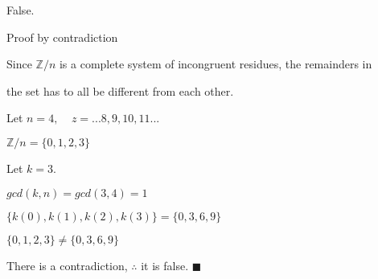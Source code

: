 \documentclass{article}
\begin{document}
\vspace{0.25cm}

False. 

\vspace{0.25cm}

Proof by contradiction

\vspace{0.25cm}

Since $\mathbb{Z}/n$ is a complete system of incongruent residues, the remainders in 

the set has to all be different from each other.

\vspace{0.25cm}

Let $n = 4,\;\;\;\;z = ...8,9,10,11...$

\vspace{0.25cm} 

\begin{center}
	$\mathbb{Z}/n = \{0,1,2,3\}$
\end{center}

Let $k = 3$.

\vspace{0.25cm} 

\begin{center}

	$gcd(k,n) = gcd(3,4) = 1$
	
	\vspace{0.25cm} 

	$\{k(0),k(1),k(2),k(3)\} = \{0,3,6,9\} $

	\vspace{0.25cm} 

	$\{0,1,2,3\} \neq \{0,3,6,9\}$

\end{center}

There is a contradiction, $\therefore$ it is false. $\blacksquare$
\end{document}
